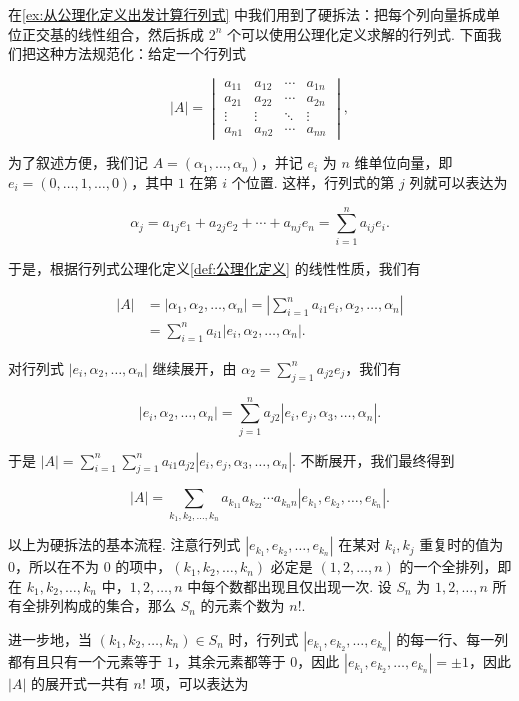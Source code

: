 在\autoref{ex:从公理化定义出发计算行列式} 中我们用到了硬拆法：把每个列向量拆成单位正交基的线性组合，然后拆成 $2^n$ 个可以使用公理化定义求解的行列式. 下面我们把这种方法规范化：给定一个行列式

\[|A| = \begin{vmatrix}
        a_{11} & a_{12} & \cdots & a_{1n} \\
        a_{21} & a_{22} & \cdots & a_{2n} \\
        \vdots & \vdots & \ddots & \vdots \\
        a_{n1} & a_{n2} & \cdots & a_{nn}
    \end{vmatrix},\]

为了叙述方便，我们记 $A = (\alpha_1,\ldots,\alpha_n)$，并记 $e_i$ 为 $n$ 维单位向量，即 $e_i = (0,\ldots,1,\ldots,0)$，其中 $1$ 在第 $i$ 个位置. 这样，行列式的第 $j$ 列就可以表达为

\[\alpha_j = a_{1j}e_1 + a_{2j}e_2 + \cdots + a_{nj}e_n = \sum_{i=1}^{n}a_{ij}e_i.\]

于是，根据行列式公理化定义\autoref{def:公理化定义} 的线性性质，我们有

\begin{align*}
    |A| & = |\alpha_1,\alpha_2,\ldots,\alpha_n| = |\sum\limits_{i=1}^{n}a_{i1}e_i,\alpha_2,\ldots,\alpha_n| \\
        & = \sum\limits_{i=1}^{n}a_{i1}|e_i,\alpha_2,\ldots,\alpha_n|.
\end{align*}

对行列式 $|e_i,\alpha_2,\ldots,\alpha_n|$ 继续展开，由 $\alpha_2 = \sum\limits_{j=1}^{n}a_{j2}e_j$，我们有

\[|e_i,\alpha_2,\ldots,\alpha_n| = \sum\limits_{j=1}^{n}a_{j2}|e_i,e_j,\alpha_3,\ldots,\alpha_n|.\]

于是 $|A| = \sum\limits_{i=1}^{n}\sum\limits_{j=1}^{n}a_{i1}a_{j2}|e_i,e_j,\alpha_3,\ldots,\alpha_n|$. 不断展开，我们最终得到

\[|A| = \sum\limits_{k_1,k_2,\ldots,k_n} a_{k_11}a_{k_22}\cdots a_{k_nn}|e_{k_1},e_{k_2},\ldots,e_{k_n}|.\]

以上为硬拆法的基本流程. 注意行列式 $|e_{k_1},e_{k_2},\ldots,e_{k_n}|$ 在某对 $k_i,k_j$ 重复时的值为 $0$，所以在不为 $0$ 的项中，$(k_1,k_2,\ldots,k_n)$ 必定是 $(1,2,\ldots,n)$ 的一个全排列，即在 $k_1,k_2,\ldots,k_n$ 中，$1,2,\ldots,n$ 中每个数都出现且仅出现一次. 设 $S_n$ 为 $1,2,\ldots,n$ 所有全排列构成的集合，那么 $S_n$ 的元素个数为 $n!$.

进一步地，当 $(k_1,k_2,\ldots,k_n) \in S_n$ 时，行列式 $|e_{k_1},e_{k_2},\ldots,e_{k_n}|$ 的每一行、每一列都有且只有一个元素等于 $1$，其余元素都等于 $0$，因此 $|e_{k_1},e_{k_2},\ldots,e_{k_n}| = \pm 1$，因此 $|A|$ 的展开式一共有 $n!$ 项，可以表达为

